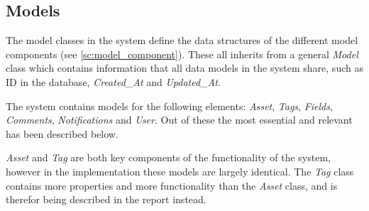 \subsection{Models}
The model classes in the system define the data structures of the different model components (see \autoref{sc:model_component}). These all inherits from a general \textit{Model} class which contains information that all data models in the system share, such as ID in the database, \textit{Created\_At} and \textit{Updated\_At}. 
\par
The system contains models for the following elements: \textit{Asset}, \textit{Tags}, \textit{Fields}, \textit{Comments}, \textit{Notifications} and \textit{User}. Out of these the most essential and relevant has been described below. 
\par
\textit{Asset} and \textit{Tag} are both key components of the functionality of the system, however in the implementation these models are largely identical. The \textit{Tag} class contains more properties and more functionality than the \textit{Asset} class, and is therefor being described in the report instead.